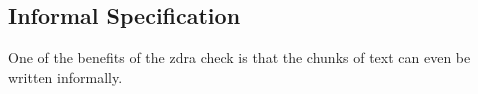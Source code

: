 \subsection{Informal Specification}

One of the benefits of the \gls{zdra} check is that the chunks of text can even be
written informally.








